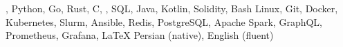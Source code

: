 
\begin{cvskilllist}
          {\Cpp, Python, Go, Rust, C, \Csharp, SQL, Java, Kotlin, Solidity,
           Bash}
          {Linux, Git, Docker, Kubernetes, Slurm, Ansible, Redis, PostgreSQL,
           Apache Spark, GraphQL, Prometheus, Grafana, LaTeX}
          {Persian (native), English (fluent)}
\end{cvskilllist}
